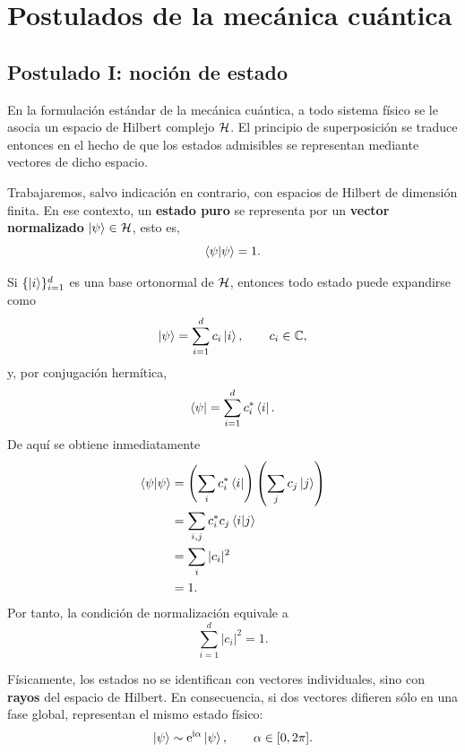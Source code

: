 \documentclass[../main.tex]{subfiles}
\begin{document}
\chapter{Postulados de la mecánica cuántica}


\section{Postulado I: noción de estado}

En la formulación estándar de la mecánica cuántica, a todo sistema físico se le asocia un espacio de Hilbert complejo $\mathcal{H}$. El principio de superposición se traduce entonces en el hecho de que los estados admisibles se representan mediante vectores de dicho espacio.

Trabajaremos, salvo indicación en contrario, con espacios de Hilbert de dimensión finita. En ese contexto, un \textbf{estado puro} se representa por un \textbf{vector normalizado} $\ket{\psi}\in\mathcal{H}$, esto es,
\begin{equation*}
    \braket{\psi|\psi}=1.
\end{equation*}

Si $\{\ket{i}\}_{i=1}^{d}$ es una base ortonormal de $\mathcal{H}$, entonces todo estado puede expandirse como
\begin{equation*}
    \ket{\psi}=\sum_{i=1}^{d}c_i\ket{i},
    \qquad c_i\in\mathbb{C},
\end{equation*}
y, por conjugación hermítica,
\begin{equation*}
    \bra{\psi}=\sum_{i=1}^{d}c_i^*\bra{i}.
\end{equation*}
De aquí se obtiene inmediatamente
\begin{align*}
    \braket{\psi|\psi}
    &=
    \left(\sum_i c_i^*\bra{i}\right)\left(\sum_j c_j\ket{j}\right)\\
    &=
    \sum_{i,j}c_i^*c_j\braket{i|j}\\
    &=
    \sum_i |c_i|^2\\
    &=
    1.
\end{align*}
Por tanto, la condición de normalización equivale a
\begin{equation*}
    \sum_{i=1}^{d}|c_i|^2=1.
\end{equation*}

Físicamente, los estados no se identifican con vectores individuales, sino con \textbf{rayos} del espacio de Hilbert. En consecuencia, si dos vectores difieren sólo en una fase global, representan el mismo estado físico:
\begin{equation*}
    \ket{\psi}\sim \mathrm{e}^{\mathrm{i}\alpha}\ket{\psi},
    \qquad \alpha\in[0,2\pi].
\end{equation*}
\end{document}
